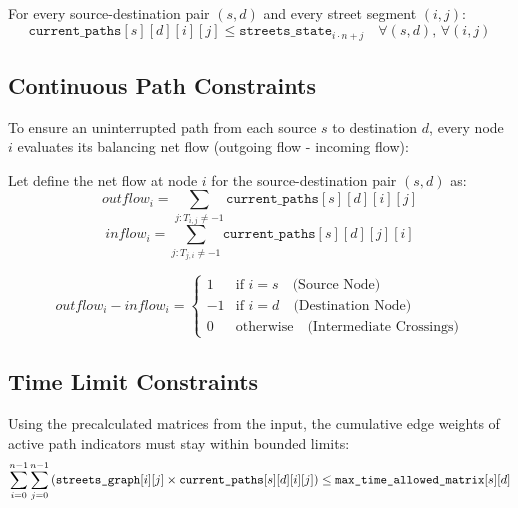 For every source-destination pair $(s,d)$ and every street segment $(i,j)$:
\begin{equation}
    \texttt{current\_paths}[s][d][i][j] \le \texttt{streets\_state}_{i \cdot n + j} \quad \forall (s,d), \, \forall (i,j)
\end{equation}

\subsection*{Continuous Path Constraints}
To ensure an uninterrupted path from each source $s$ to destination $d$, every node $i$ evaluates its balancing net flow (outgoing flow - incoming flow):

Let define the net flow at node $i$ for the source-destination pair $(s,d)$ as:
\begin{equation}
    outflow_i = \sum_{j : T_{i,j} \neq -1} \texttt{current\_paths}[s][d][i][j]
\end{equation}
\begin{equation}
    inflow_i = \sum_{j : T_{j,i} \neq -1} \texttt{current\_paths}[s][d][j][i]
\end{equation}

\begin{equation}
    outflow_i - inflow_i = 
    \begin{cases} 
        1 & \text{if } i = s \quad \text{(Source Node)} \\
        -1 & \text{if } i = d \quad \text{(Destination Node)} \\
        0 & \text{otherwise} \quad \text{(Intermediate Crossings)}
    \end{cases}
\end{equation}

\subsection*{Time Limit Constraints}
Using the precalculated matrices from the input, the cumulative edge weights of active path indicators must stay within bounded limits:
\begin{equation}
    \sum_{i=0}^{n-1} \sum_{j=0}^{n-1} \left( \text{\texttt{streets\_graph}}[i][j] \times \texttt{current\_paths}[s][d][i][j] \right) \le \text{\texttt{max\_time\_allowed\_matrix}}[s][d]
\end{equation}


